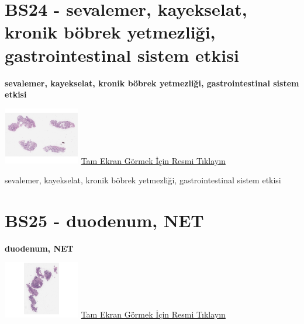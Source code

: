 \documentclass[
  letterpaper,
  DIV=11,
  numbers=noendperiod]{scrreprt}
\begin{document}
\hypertarget{sec-BS24}{%
\section{BS24 - sevalemer, kayekselat, kronik böbrek yetmezliği,
gastrointestinal sistem etkisi}\label{sec-BS24}}

\textbf{sevalemer, kayekselat, kronik böbrek yetmezliği,
gastrointestinal sistem etkisi}

\href{https://images.patolojiatlasi.com/BS24/HE.html}{\includegraphics[width=0.25\textwidth,height=\textheight]{./screenshots/thumbnail_BS24-HE.png}}
\href{https://images.patolojiatlasi.com/BS24/HE.html}{Tam Ekran Görmek
İçin Resmi Tıklayın}

\begin{tcolorbox}[enhanced jigsaw, colbacktitle=quarto-callout-tip-color!10!white, colback=white, titlerule=0mm, opacityback=0, colframe=quarto-callout-tip-color-frame, opacitybacktitle=0.6, bottomrule=.15mm, breakable, coltitle=black, title=\textcolor{quarto-callout-tip-color}{\faLightbulb}\hspace{0.5em}{Tanı}, toprule=.15mm, toptitle=1mm, bottomtitle=1mm, arc=.35mm, rightrule=.15mm, leftrule=.75mm, left=2mm]

sevalemer, kayekselat, kronik böbrek yetmezliği, gastrointestinal sistem
etkisi

\end{tcolorbox}

\hypertarget{sec-BS25}{%
\section{BS25 - duodenum, NET}\label{sec-BS25}}

\textbf{duodenum, NET}

\href{https://images.patolojiatlasi.com/BS25/HE.html}{\includegraphics[width=0.25\textwidth,height=\textheight]{./screenshots/thumbnail_BS25-HE.png}}
\href{https://images.patolojiatlasi.com/BS25/HE.html}{Tam Ekran Görmek
İçin Resmi Tıklayın}
\end{document}
